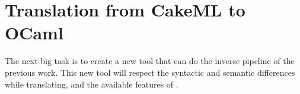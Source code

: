 \begin{itemize}



\end{itemize}

\section{Translation from CakeML to OCaml}

The next big task is to create a new tool that can do the inverse pipeline of the previous work. This new tool will respect
the syntactic and semantic differences while translating, and the available features of \cml.

